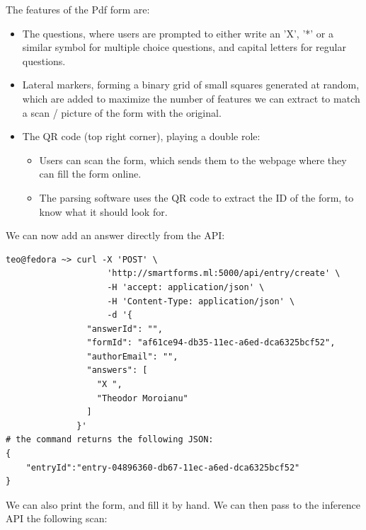\documentclass[11pt, a4paper]{report}
\begin{document}
The features of the Pdf form are:
\begin{itemize}
    \item The questions, where users are prompted to either write an 'X', '*' or a similar symbol for multiple choice questions, and capital letters for regular questions.
    \item Lateral markers, forming a binary grid of small squares generated at random, which are added to maximize the number of features we can extract to match a scan / picture of the form with the original.
    \item The QR code (top right corner), playing a double role:
    \begin{itemize}
        \item Users can scan the form, which sends them to the webpage where they can fill the form online.
        \item The parsing software uses the QR code to extract the ID of the form, to know what it should look for.
    \end{itemize}
\end{itemize}

We can now add an answer directly from the API:

\begin{verbatim}
teo@fedora ~> curl -X 'POST' \
                    'http://smartforms.ml:5000/api/entry/create' \
                    -H 'accept: application/json' \
                    -H 'Content-Type: application/json' \
                    -d '{
                "answerId": "",
                "formId": "af61ce94-db35-11ec-a6ed-dca6325bcf52",
                "authorEmail": "",
                "answers": [
                  "X ",
                  "Theodor Moroianu"
                ]
              }'
# the command returns the following JSON:
{
    "entryId":"entry-04896360-db67-11ec-a6ed-dca6325bcf52"
}
\end{verbatim}

We can also print the form, and fill it by hand. We can then pass to the inference API the following scan:
\end{document}
